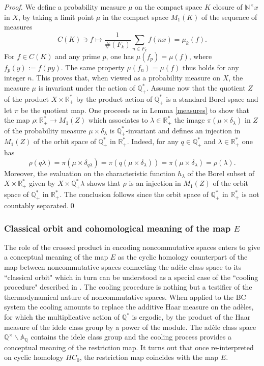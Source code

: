 \documentclass[graybox, envcountsect%
]{svmult}
\def\A{{\mathbb A}}
\def\N{{\mathbb N}}
\def\Q{{\mathbb Q}}
\def\R{{\mathbb R}}
\def\nt{\N^{\times}}
\begin{document}
\begin{proof} We define a probability  measure $\mu$ on the compact space $K$  closure of $\nt x$ in $X$, by taking a limit point $\mu$ in the compact space $M_1(K)$ of the sequence of measures
$$
C(K)\ni f\mapsto \frac{1}{\#(F_k)} \sum_{n\in F_k} f(nx)=\mu_k(f).
$$
For $f\in C(K)$ and any prime $p$, one has $\mu(f_p)=\mu(f)$, where $f_p(y):=f(py)$. The same property $\mu(f_n)=\mu(f)$ thus holds for any integer $n$. This proves that, when viewed as a probability measure on $X$, the measure $\mu$ is invariant under the action of $\Q_+^*$. Assume now that the quotient $Z$ of the product $X\times \R_+^*$ by the product action of $\Q_+^*$ is  a standard Borel space and let $\pi$ be the quotient map. One proceeds as in Lemma \ref{measures} to show that the map $\rho:\R_+^*\to M_1(Z)$ which associates to $\lambda\in \R_+^*$ the image $\pi(\mu\times \delta_\lambda)$ in $Z$ of the probability measure $\mu\times \delta_\lambda$ is $\Q_+^*$-invariant and defines an injection in $M_1(Z)$ of the orbit space of $\Q_+^*$ in $\R_+^*$. Indeed, for any $q\in \Q_+^*$ and $\lambda \in \R_+^*$ one has
$$
\rho(q\lambda)=\pi(\mu\times \delta_{q\lambda})=\pi(q(\mu\times \delta_{\lambda}))=
\pi(\mu\times \delta_{\lambda})=\rho(\lambda).
$$
Moreover, the evaluation on the characteristic function $h_\lambda$ of the  Borel subset of $X\times \R_+^*$ given by $X\times \Q_+^*\lambda$ shows that $\rho$ is an injection in $M_1(Z)$ of the orbit space of $\Q_+^*$ in $\R_+^*$. The conclusion follows since the orbit space of $\Q_+^*$ in $\R_+^*$ is not countably separated.\qed \end{proof} 

\subsubsection{Classical orbit and cohomological meaning of the map $E$}\label{subsubsec:2.1.4}

The role of the crossed product in encoding  noncommutative spaces enters to give a conceptual meaning of the map $E$ as the cyclic homology counterpart of the map between noncommutative spaces connecting the ad\`ele class space to its ``classical orbit" which in turn can be understood as a special case of the ``cooling procedure" described in \cite{cmbook}. The cooling procedure is nothing but a testifier of the thermodynamical nature of noncommutative spaces. When applied to the BC system the cooling amounts to replace the additive Haar measure on the ad\`eles, for which the multiplicative action of $\Q^*$ is ergodic, by the product of the Haar measure of the idele class group by a power of the module. The ad\`ele class space $\Q^\times\backslash\A_\Q$ contains the idele class group and the cooling process provides a conceptual meaning of the restriction map. It turns out that once re-interpreted on cyclic homology $HC_0$, the restriction map coincides with the map $E$. 
\end{document}
